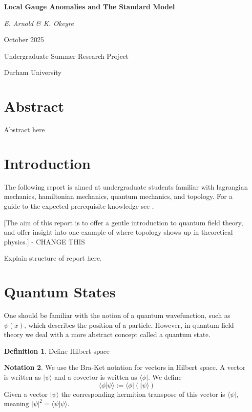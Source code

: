 \documentclass[11pt, a4paper]{article}
\theoremstyle{definition}
\newtheorem{defn}{Definition}[section]
\newtheorem{notation}[defn]{Notation}
\theoremstyle{plain}
\begin{document}
\begin{titlepage}
    \centering
    {\huge \bfseries Local Gauge Anomalies and The Standard Model \par}
    \vspace{1cm}
    {\Large \itshape E. Arnold \& K. Okeyre\par}
    \vfill
    {\Large October 2025 \par}
    {\Large Undergraduate Summer Research Project \par}
    {\Large Durham University \par}
\end{titlepage}

\section*{Abstract}
Abstract here
\newpage

\tableofcontents
\newpage

\section{Introduction}

The following report is aimed at undergraduate 
students familiar with lagrangian mechanics, hamiltonian mechanics,
quantum mechanics, and topology. For a guide to the expected prerequisite knowledge see \cite{mathphys1, mathphys2, topnotes}.

[The aim of this report is to offer a gentle 
introduction to quantum field theory, and offer 
insight into one example of where topology shows up 
in theoretical physics.] - CHANGE THIS

Explain structure of report here. 

\section{Quantum States}

One should be familiar with the notion of a quantum wavefunction, such as 
$\psi(x)$, which describes the position of a particle. 
However, in quantum field theory we deal with a more 
abstract concept called a quantum state.

\begin{defn}
Define Hilbert space
\end{defn}

\begin{notation}
We use the Bra-Ket notation for vectors in Hilbert space. A 
vector is written as $| \psi \rangle$ and a covector is 
written as $\langle \phi |$. We define \[ \langle \phi | \psi \rangle := \langle \phi | (| \psi \rangle) \]
Given a vector 
$| \psi \rangle$ the corresponding hermition transpose of 
this vector is $\langle \psi |$, meaning 
$|\psi|^2 = \langle \psi | \psi \rangle$.
\end{notation}
\end{document}

